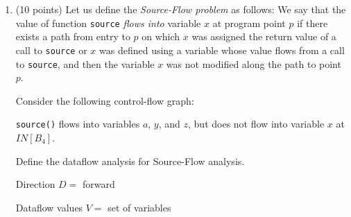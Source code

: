 \documentclass[12pt]{article}
\begin{document}
\begin{enumerate}
\begin{mdframed}
      \end{mdframed}
      
      \clearpage
      \item (10 points)
      Let us define the \emph{Source-Flow problem} as follows:
      We say that the value of function \lstinline$source$ \emph{flows into} variable $x$ at program point $p$ if
      there exists a path from entry to $p$ on which $x$ was assigned the return value of a call to \lstinline$source$
      or $x$ was defined using a variable whose value flows from a call to \lstinline$source$,
      and then the variable $x$ was not modified along the path to point $p$.

      Consider the following control-flow graph:

      \begin{center}
    \end{center}

      \lstinline$source()$ flows into variables $a$, $y$, and $z$, but does not
      flow into variable $x$ at $IN[B_4]$.

      Define the dataflow analysis for Source-Flow analysis.

      \begin{mdframed}
        Direction $D = $ forward

        Dataflow values $V = $ set of variables


\end{mdframed}
\end{enumerate}
\end{document}
